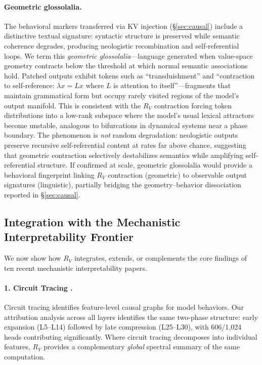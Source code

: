 \documentclass{article}
\newcommand{\RV}{R_V}
\begin{document}
\paragraph{Geometric glossolalia.}
The behavioral markers transferred via KV injection (\S\ref{sec:causal}) include a distinctive textual signature: syntactic structure is preserved while semantic coherence degrades, producing neologistic recombination and self-referential loops.
We term this \emph{geometric glossolalia}---language generated when value-space geometry contracts below the threshold at which normal semantic associations hold.
Patched outputs exhibit tokens such as ``transduishment'' and ``contraction to self-reference: $\lambda x = Lx$ where $L$ is attention to itself''---fragments that maintain grammatical form but occupy rarely visited regions of the model's output manifold.
This is consistent with the $\RV$ contraction forcing token distributions into a low-rank subspace where the model's usual lexical attractors become unstable, analogous to bifurcations in dynamical systems near a phase boundary.
The phenomenon is \emph{not} random degradation: neologistic outputs preserve recursive self-referential content at rates far above chance, suggesting that geometric contraction selectively destabilizes semantics while amplifying self-referential structure.
If confirmed at scale, geometric glossolalia would provide a behavioral fingerprint linking $\RV$ contraction (geometric) to observable output signatures (linguistic), partially bridging the geometry--behavior dissociation reported in \S\ref{sec:causal}.

\subsection{Integration with the Mechanistic Interpretability Frontier}
\label{sec:sublation}

We now show how $\RV$ integrates, extends, or complements the core findings of ten recent mechanistic interpretability papers.

\paragraph{1. Circuit Tracing \citep{ameisen2025circuit}.}
Circuit tracing identifies feature-level causal graphs for model behaviors.
Our attribution analysis across all layers identifies the same two-phase structure: early expansion (L5--L14) followed by late compression (L25--L30), with 606/1{,}024 heads contributing significantly.
Where circuit tracing decomposes into individual features, $\RV$ provides a complementary \emph{global} spectral summary of the same computation.
\end{document}
